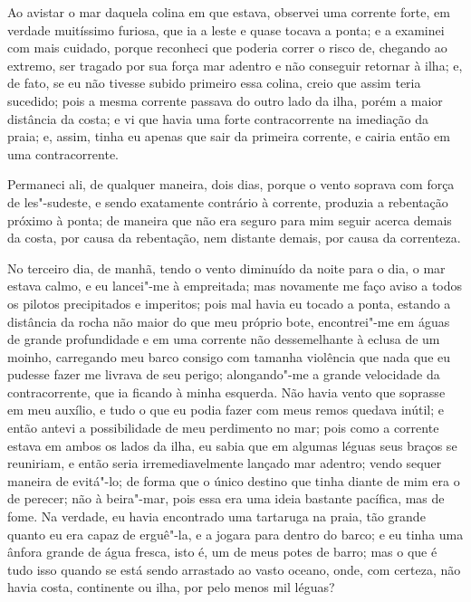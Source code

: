 Ao avistar o mar daquela colina em que estava, observei uma corrente
forte, em verdade muitíssimo furiosa, que ia a leste e quase tocava a
ponta; e a examinei com mais cuidado, porque reconheci que poderia
correr o risco de, chegando ao extremo, ser tragado por sua força mar
adentro e não conseguir retornar à ilha; e, de fato, se eu não tivesse
subido primeiro essa colina, creio que assim teria sucedido; pois a
mesma corrente passava do outro lado da ilha, porém a maior distância da
costa; e vi que havia uma forte contracorrente na imediação da praia; e,
assim, tinha eu apenas que sair da primeira corrente, e cairia então em
uma contracorrente.

Permaneci ali, de qualquer maneira, dois dias, porque o vento soprava
com força de les"-sudeste, e sendo exatamente contrário à corrente,
produzia a rebentação próximo à ponta; de maneira que não era seguro
para mim seguir acerca demais da costa, por causa da rebentação, nem
distante demais, por causa da correnteza.

No terceiro dia, de manhã, tendo o vento diminuído da noite para o dia,
o mar estava calmo, e eu lancei"-me à empreitada; mas novamente me faço
aviso a todos os pilotos precipitados e imperitos; pois mal havia eu
tocado a ponta, estando a distância da rocha não maior do que meu
próprio bote, encontrei"-me em águas de grande profundidade e em uma
corrente não dessemelhante à eclusa de um moinho, carregando meu barco
consigo com tamanha violência que nada que eu pudesse fazer me livrava
de seu perigo; alongando"-me a grande velocidade da contracorrente, que
ia ficando à minha esquerda. Não havia vento que soprasse em meu
auxílio, e tudo o que eu podia fazer com meus remos quedava inútil; e
então antevi a possibilidade de meu perdimento no mar; pois como a
corrente estava em ambos os lados da ilha, eu sabia que em algumas
léguas seus braços se reuniriam, e então seria irremediavelmente lançado
mar adentro; vendo sequer maneira de evitá"-lo; de forma que o único
destino que tinha diante de mim era o de perecer; não à beira"-mar, pois
essa era uma ideia bastante pacífica, mas de fome. Na verdade, eu havia
encontrado uma tartaruga na praia, tão grande quanto eu era capaz de
erguê"-la, e a jogara para dentro do barco; e eu tinha uma ânfora grande
de água fresca, isto é, um de meus potes de barro; mas o que é tudo isso
quando se está sendo arrastado ao vasto oceano, onde, com certeza, não
havia costa, continente ou ilha, por pelo menos mil léguas?

